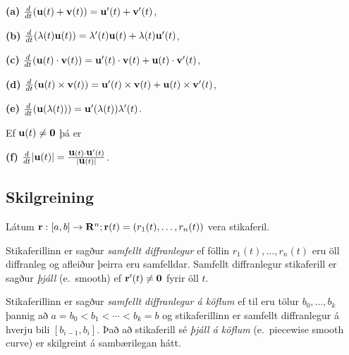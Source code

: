 \documentclass[a4paper,10pt,icelandic]{sphinxmanual}
\begin{document}
\textbf{(a)}
\(\frac{d}{dt}(\mbox{${\bf u}$}(t)+\mbox{${\bf v}$}(t))=\mbox{${\bf u}$}'(t)+\mbox{${\bf v}$}'(t)\),

\textbf{(b)}
\(\frac{d}{dt}(\lambda(t)\mbox{${\bf u}$}(t))=\lambda'(t)\mbox{${\bf u}$}(t)+\lambda(t)\mbox{${\bf u}$}'(t)\),

\textbf{(c)}
\(\frac{d}{dt}(\mbox{${\bf u}$}(t)\cdot\mbox{${\bf v}$}(t))=\mbox{${\bf u}$}'(t)\cdot\mbox{${\bf v}$}(t)+\mbox{${\bf u}$}(t)\cdot\mbox{${\bf v}$}'(t)\),

\textbf{(d)}
\(\frac{d}{dt}(\mbox{${\bf u}$}(t)\times\mbox{${\bf v}$}(t))=\mbox{${\bf u}$}'(t)\times\mbox{${\bf v}$}(t)+\mbox{${\bf u}$}(t)\times\mbox{${\bf v}$}'(t)\),

\textbf{(e)}
\(\frac{d}{dt}(\mbox{${\bf u}$}(\lambda(t)))=\mbox{${\bf u}$}'(\lambda(t))\lambda'(t)\).

Ef \(\mbox{${\bf u}$}(t)\neq\mbox{${\bf 0}$}\) þá er

\textbf{(f)}
\(\frac{d}{dt}|\mbox{${\bf u}$}(t)|=\frac{\mbox{${\bf u}$}(t)\cdot\mbox{${\bf u}$}'(t)}{|\mbox{${\bf u}$}(t)|}\).


\subsection{Skilgreining}
\label{Kafli1:id6}\label{Kafli1:index-4}
Látum
\(\mbox{${\bf r}$}:  [a,b]\rightarrow \mbox{${\bf R}^n$}; \mbox{${\bf r}$}(t)=(r_1(t),\ldots,r_n(t))\)
vera stikaferil.

Stikaferillinn er sagður \emph{samfellt diffranlegur} ef föllin
\(r_1(t),\ldots,r_n(t)\) eru öll diffranleg og afleiður þeirra eru
samfelldar. Samfellt diffranlegur stikaferill er sagður \emph{þjáll}
(e. smooth) ef \(\mbox{${\bf r}$}'(t)\neq\mbox{${\bf 0}$}\) fyrir
öll \(t\).

Stikaferillinn er sagður \emph{samfellt diffranlegur á köflum} ef til eru
tölur \(b_0,\ldots,b_k\) þannig að \(a=b_0<b_1<\cdots<b_k=b\) og
stikaferillinn er samfellt diffranlegur á hverju bili
\([b_{i-1}, b_i]\). Það að stikaferill sé \emph{þjáll á köflum}
(e. piecewise smooth curve) er skilgreint á sambærilegan hátt.

\end{document}
